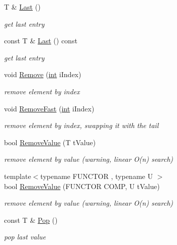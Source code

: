 \begin{DoxyCompactItemize}
T \& \hyperlink{classCSphVector_abed89439189fcb978199b3c34071dfc8}{Last} ()
\begin{DoxyCompactList}\small\item\em get last entry \end{DoxyCompactList}\item 
const T \& \hyperlink{classCSphVector_a8c84f048a98fa1c6bb9eebd80a6ea7fb}{Last} () const 
\begin{DoxyCompactList}\small\item\em get last entry \end{DoxyCompactList}\item 
void \hyperlink{classCSphVector_a9ebaf9cbc7f63b631e2223cb932b1ecf}{Remove} (\hyperlink{sphinxexpr_8cpp_a4a26e8f9cb8b736e0c4cbf4d16de985e}{int} i\-Index)
\begin{DoxyCompactList}\small\item\em remove element by index \end{DoxyCompactList}\item 
void \hyperlink{classCSphVector_a5603b6d8bd78462e13501ddb3c5c9793}{Remove\-Fast} (\hyperlink{sphinxexpr_8cpp_a4a26e8f9cb8b736e0c4cbf4d16de985e}{int} i\-Index)
\begin{DoxyCompactList}\small\item\em remove element by index, swapping it with the tail \end{DoxyCompactList}\item 
bool \hyperlink{classCSphVector_ab5c0a788503616a0ea4862e61d086321}{Remove\-Value} (T t\-Value)
\begin{DoxyCompactList}\small\item\em remove element by value (warning, linear O(n) search) \end{DoxyCompactList}\item 
{\footnotesize template$<$typename F\-U\-N\-C\-T\-O\-R , typename U $>$ }\\bool \hyperlink{classCSphVector_a3940499e1e8d65d06ee5564268ed3d93}{Remove\-Value} (F\-U\-N\-C\-T\-O\-R C\-O\-M\-P, U t\-Value)
\begin{DoxyCompactList}\small\item\em remove element by value (warning, linear O(n) search) \end{DoxyCompactList}\item 
const T \& \hyperlink{classCSphVector_a35ec9c83ff3f850f8eaa1b47b3fbd5fe}{Pop} ()
\begin{DoxyCompactList}\small\item\em pop last value \end{DoxyCompactList}\item 

\end{DoxyCompactItemize}
